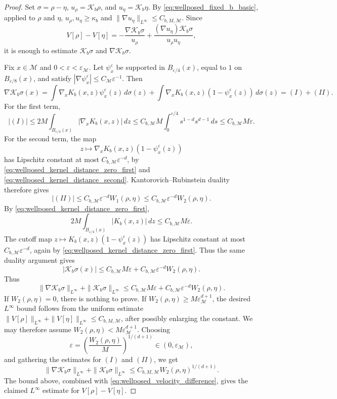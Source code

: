\documentclass[11pt]{article}
\theoremstyle{definition}
\def\M{\mathcal M}
\begin{document}
\begin{proof}
Set \(\sigma=\rho-\eta\), \(u_\rho=\mathcal K_b\rho\), and \(u_\eta=\mathcal K_b\eta\). By
\eqref{eq:wellposed_fixed_b_basic}, applied to \(\rho\) and \(\eta\),
\(u_\rho,u_\eta\ge\kappa_b\) and \(\|\nabla u_\eta\|_{L^\infty}\le C_{b,M,\M}\).
Since
\begin{equation}\label{eq:wellposed_velocity_difference}
V[\rho]-V[\eta]
=-\frac{\nabla \mathcal K_b\sigma}{u_\rho}
+\frac{(\nabla u_\eta)\mathcal K_b\sigma}{u_\rho u_\eta},
\end{equation}
it is enough to estimate \(\mathcal K_b\sigma\) and \(\nabla \mathcal K_b\sigma\).

Fix \(x\in \M\) and \(0<\varepsilon<\varepsilon_{\M}\). Let
\(\psi_x^\varepsilon\) be supported in \(B_{\varepsilon/4}(x)\), equal to
\(1\) on \(B_{\varepsilon/8}(x)\), and satisfy
\(|\nabla\psi_x^\varepsilon|\le C_{\M}\varepsilon^{-1}\). Then
\[
\nabla \mathcal K_b\sigma(x)
=\int\nabla_xK_b(x,z)\psi_x^\varepsilon(z)\,d\sigma(z)
+\int\nabla_xK_b(x,z)(1-\psi_x^\varepsilon(z))\,d\sigma(z)
=(I)+(II).
\]
For the first term,
\[
|(I)|
\le 2M\int_{B_{\varepsilon/4}(x)}|\nabla_xK_b(x,z)|\,dz
\le C_{b,\M} M\int_0^{\varepsilon/4}s^{1-d}s^{d-1}\,ds
\le C_{b,\M} M\varepsilon .
\]
For the second term, the map
\[
z\mapsto\nabla_xK_b(x,z)(1-\psi_x^\varepsilon(z))
\]
has Lipschitz constant at most \(C_{b,\M}\varepsilon^{-d}\), by
\eqref{eq:wellposed_kernel_distance_zero_first} and
\eqref{eq:wellposed_kernel_distance_second}. Kantorovich--Rubinstein duality
therefore gives
\[
|(II)|\le C_{b,\M}\varepsilon^{-d}W_1(\rho,\eta)
\le C_{b,\M}\varepsilon^{-d}W_2(\rho,\eta).
\]
By \eqref{eq:wellposed_kernel_distance_zero_first},
\[
2M\int_{B_{\varepsilon/4}(x)}|K_b(x,z)|\,dz\le C_{b,\M} M\varepsilon .
\]
The cutoff map \(z\mapsto K_b(x,z)(1-\psi_x^\varepsilon(z))\) has Lipschitz
constant at most \(C_{b,\M}\varepsilon^{-d}\), again by
\eqref{eq:wellposed_kernel_distance_zero_first}. Thus the same duality
argument gives
\[
|\mathcal K_b\sigma(x)|
\le C_{b,\M} M\varepsilon+C_{b,\M}\varepsilon^{-d}W_2(\rho,\eta).
\]
Thus
\[
\|\nabla \mathcal K_b\sigma\|_{L^\infty}+\|\mathcal K_b\sigma\|_{L^\infty}
\le C_{b,\M} M\varepsilon+C_{b,\M}\varepsilon^{-d}W_2(\rho,\eta).
\]
If \(W_2(\rho,\eta)=0\), there is nothing to prove. If
\(W_2(\rho,\eta)\ge M\varepsilon_{\M}^{d+1}\), the desired \(L^\infty\) bound
follows from the uniform estimate \(\|V[\rho]\|_{L^\infty}+\|V[\eta]\|_{L^\infty}
\le C_{b,M,\M}\), after possibly enlarging the constant. We may therefore assume
\(W_2(\rho,\eta)<M\varepsilon_{\M}^{d+1}\). Choosing
\[
\varepsilon
=\left(\frac{W_2(\rho,\eta)}{M}\right)^{ 1/(d+1)}\in(0,\varepsilon_{\M}),
\]
and gathering the estimates for \((I)\) and \((II)\), we get
\[
\|\nabla \mathcal K_b\sigma\|_{L^\infty}+\|\mathcal K_b\sigma\|_{L^\infty}
\le C_{b,M,\M}W_2(\rho,\eta)^{ 1/(d+1)}.
\]
The bound above, combined with \eqref{eq:wellposed_velocity_difference}, gives the claimed
\(L^\infty\) estimate for \(V[\rho]-V[\eta]\).


\end{proof}
\end{document}
